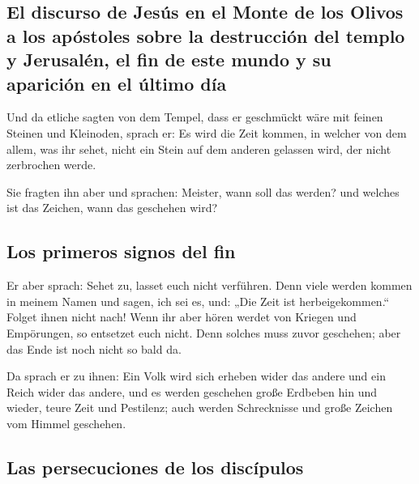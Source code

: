 \hypertarget{el-discurso-de-jesuxfas-en-el-monte-de-los-olivos-a-los-apuxf3stoles-sobre-la-destrucciuxf3n-del-templo-y-jerusaluxe9n-el-fin-de-este-mundo-y-su-apariciuxf3n-en-el-uxfaltimo-duxeda}{%
\subsection{El discurso de Jesús en el Monte de los Olivos a los
apóstoles sobre la destrucción del templo y Jerusalén, el fin de este
mundo y su aparición en el último
día}\label{el-discurso-de-jesuxfas-en-el-monte-de-los-olivos-a-los-apuxf3stoles-sobre-la-destrucciuxf3n-del-templo-y-jerusaluxe9n-el-fin-de-este-mundo-y-su-apariciuxf3n-en-el-uxfaltimo-duxeda}}

 Und da etliche sagten von dem Tempel, dass er geschmückt
wäre mit feinen Steinen und Kleinoden, sprach er:  Es wird
die Zeit kommen, in welcher von dem allem, was ihr sehet, nicht ein
Stein auf dem anderen gelassen wird, der nicht zerbrochen werde.

 Sie fragten ihn aber und sprachen: Meister, wann soll das
werden? und welches ist das Zeichen, wann das geschehen wird?

\hypertarget{los-primeros-signos-del-fin}{%
\subsection{Los primeros signos del
fin}\label{los-primeros-signos-del-fin}}

 Er aber sprach: Sehet zu, lasset euch nicht verführen.
Denn viele werden kommen in meinem Namen und sagen, ich sei es, und:
„Die Zeit ist herbeigekommen.`` Folget ihnen nicht nach! 
Wenn ihr aber hören werdet von Kriegen und Empörungen, so entsetzet euch
nicht. Denn solches muss zuvor geschehen; aber das Ende ist noch nicht
so bald da.

 Da sprach er zu ihnen: Ein Volk wird sich erheben wider
das andere und ein Reich wider das andere,  und es werden
geschehen große Erdbeben hin und wieder, teure Zeit und Pestilenz; auch
werden Schrecknisse und große Zeichen vom Himmel geschehen.

\hypertarget{las-persecuciones-de-los-discuxedpulos}{%
\subsection{Las persecuciones de los
discípulos}\label{las-persecuciones-de-los-discuxedpulos}}

